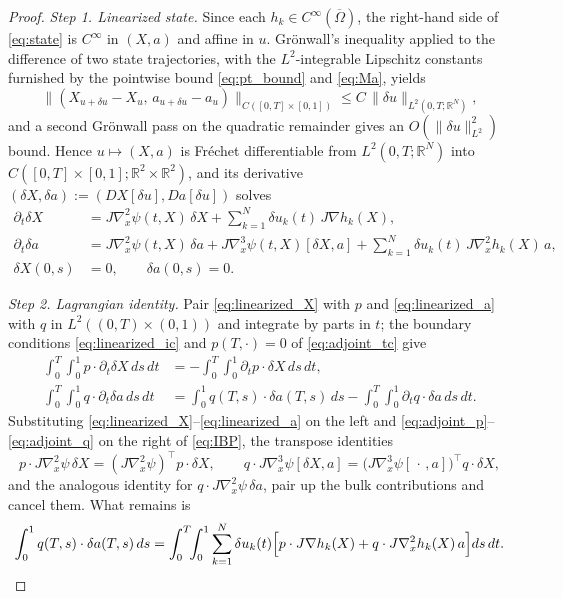 \documentclass[12pt, reqno]{amsart}
\theoremstyle{plain}
\theoremstyle{definition}
\numberwithin{equation}{section}
\numberwithin{figure}{section}
\numberwithin{algorithm}{section}
\begin{document}
\begin{proof}
\textit{Step 1. Linearized state.}
Since each $h_k\in C^\infty(\overline\Omega)$, the right-hand side of \eqref{eq:state} is $C^\infty$ in $(X,a)$ and affine in $u$. Gr\"onwall's inequality applied to the difference of two state trajectories, with the $L^2$-integrable Lipschitz constants furnished by the pointwise bound \eqref{eq:pt_bound} and \eqref{eq:Ma}, yields
\[
\|(X_{u+\delta u}-X_u,\,a_{u+\delta u}-a_u)\|_{C([0,T]\times[0,1])}\le C\,\|\delta u\|_{L^2(0,T;\mathbb R^N)},
\]
and a second Gr\"onwall pass on the quadratic remainder gives an $O(\|\delta u\|_{L^2}^2)$ bound. Hence $u\mapsto(X,a)$ is Fr\'echet differentiable from $L^2(0,T;\mathbb R^N)$ into $C([0,T]\times[0,1];\mathbb R^2\times\mathbb R^2)$, and its derivative $(\delta X,\delta a):=(DX[\delta u],Da[\delta u])$ solves
\begin{subequations}
\begin{align}
\partial_t\delta X &= J\nabla_x^2\psi(t,X)\,\delta X+\sum_{k=1}^N\delta u_k(t)\,J\nabla h_k(X),\label{eq:linearized_X}\\
\partial_t\delta a &= J\nabla_x^2\psi(t,X)\,\delta a+J\nabla_x^3\psi(t,X)[\delta X,a]+\sum_{k=1}^N\delta u_k(t)\,J\nabla_x^2 h_k(X)\,a,\label{eq:linearized_a}\\
\delta X(0,s)&=0,\qquad \delta a(0,s)=0.\label{eq:linearized_ic}
\end{align}
\end{subequations}

\vskip 5pt
\noindent\textit{Step 2. Lagrangian identity.}
Pair \eqref{eq:linearized_X} with $p$ and \eqref{eq:linearized_a} with $q$ in $L^2((0,T)\times(0,1))$ and integrate by parts in $t$; the boundary conditions \eqref{eq:linearized_ic} and $p(T,\cdot)=0$ of \eqref{eq:adjoint_tc} give
\begin{equation}\label{eq:IBP}
\begin{aligned}
\int_0^T\!\!\int_0^1 p\cdot\partial_t\delta X\,ds\,dt &= -\int_0^T\!\!\int_0^1 \partial_t p\cdot\delta X\,ds\,dt,\\
\int_0^T\!\!\int_0^1 q\cdot\partial_t\delta a\,ds\,dt &= \int_0^1 q(T,s)\cdot\delta a(T,s)\,ds-\int_0^T\!\!\int_0^1 \partial_t q\cdot\delta a\,ds\,dt.
\end{aligned}
\end{equation}
Substituting \eqref{eq:linearized_X}--\eqref{eq:linearized_a} on the left and \eqref{eq:adjoint_p}--\eqref{eq:adjoint_q} on the right of \eqref{eq:IBP}, the transpose identities
\[
p\cdot J\nabla_x^2\psi\,\delta X=(J\nabla_x^2\psi)^\top p\cdot\delta X,
\qquad
q\cdot J\nabla_x^3\psi[\delta X,a]=\bigl(J\nabla_x^3\psi[\,\cdot\,,a]\bigr)^\top q\cdot\delta X,
\]
and the analogous identity for $q\cdot J\nabla_x^2\psi\,\delta a$, pair up the bulk contributions and cancel them. What remains is
\begin{align}\label{eq:Lagrangian_id}
\int_0^1 q(T,s)\cdot\delta a(T,s)\,ds
=\int_0^T\!\!\int_0^1\sum_{k=1}^N\delta u_k(t)\Bigl[p\cdot J\nabla h_k(X)+q\cdot J\nabla_x^2 h_k(X)\,a\Bigr]ds\,dt.
\end{align}


\end{proof}
\end{document}
